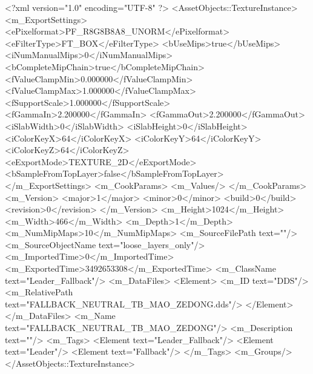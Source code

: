 <?xml version="1.0" encoding="UTF-8" ?>
<AssetObjects::TextureInstance>
	<m_ExportSettings>
		<ePixelformat>PF_R8G8B8A8_UNORM</ePixelformat>
		<eFilterType>FT_BOX</eFilterType>
		<bUseMips>true</bUseMips>
		<iNumManualMips>0</iNumManualMips>
		<bCompleteMipChain>true</bCompleteMipChain>
		<fValueClampMin>0.000000</fValueClampMin>
		<fValueClampMax>1.000000</fValueClampMax>
		<fSupportScale>1.000000</fSupportScale>
		<fGammaIn>2.200000</fGammaIn>
		<fGammaOut>2.200000</fGammaOut>
		<iSlabWidth>0</iSlabWidth>
		<iSlabHeight>0</iSlabHeight>
		<iColorKeyX>64</iColorKeyX>
		<iColorKeyY>64</iColorKeyY>
		<iColorKeyZ>64</iColorKeyZ>
		<eExportMode>TEXTURE_2D</eExportMode>
		<bSampleFromTopLayer>false</bSampleFromTopLayer>
	</m_ExportSettings>
	<m_CookParams>
		<m_Values/>
	</m_CookParams>
	<m_Version>
		<major>1</major>
		<minor>0</minor>
		<build>0</build>
		<revision>0</revision>
	</m_Version>
	<m_Height>1024</m_Height>
	<m_Width>466</m_Width>
	<m_Depth>1</m_Depth>
	<m_NumMipMaps>10</m_NumMipMaps>
	<m_SourceFilePath text=""/>
	<m_SourceObjectName text="loose_layers_only"/>
	<m_ImportedTime>0</m_ImportedTime>
	<m_ExportedTime>3492653308</m_ExportedTime>
	<m_ClassName text="Leader_Fallback"/>
	<m_DataFiles>
		<Element>
			<m_ID text="DDS"/>
			<m_RelativePath text="FALLBACK_NEUTRAL_TB_MAO_ZEDONG.dds"/>
		</Element>
	</m_DataFiles>
	<m_Name text="FALLBACK_NEUTRAL_TB_MAO_ZEDONG"/>
	<m_Description text=""/>
	<m_Tags>
		<Element text="Leader_Fallback"/>
		<Element text="Leader"/>
		<Element text="Fallback"/>
	</m_Tags>
	<m_Groups/>
</AssetObjects::TextureInstance>